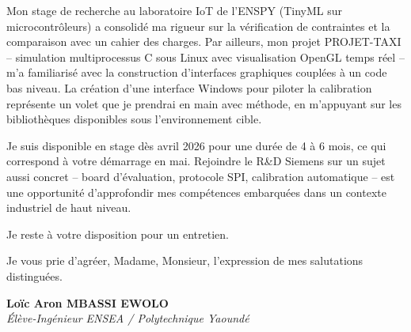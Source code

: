\documentclass[a4paper,11pt]{article}
\begin{document}
Mon stage de recherche au laboratoire IoT de l'ENSPY (TinyML sur microcontrôleurs) a consolidé ma rigueur sur la vérification de contraintes et la comparaison avec un cahier des charges. Par ailleurs, mon projet PROJET-TAXI -- simulation multiprocessus C sous Linux avec visualisation OpenGL temps réel -- m'a familiarisé avec la construction d'interfaces graphiques couplées à un code bas niveau. La création d'une interface Windows pour piloter la calibration représente un volet que je prendrai en main avec méthode, en m'appuyant sur les bibliothèques disponibles sous l'environnement cible.

Je suis disponible en stage dès avril 2026 pour une durée de 4 à 6 mois, ce qui correspond à votre démarrage en mai. Rejoindre le R\&D Siemens sur un sujet aussi concret -- board d'évaluation, protocole SPI, calibration automatique -- est une opportunité d'approfondir mes compétences embarquées dans un contexte industriel de haut niveau.

Je reste à votre disposition pour un entretien.

Je vous prie d'agréer, Madame, Monsieur, l'expression de mes salutations distinguées.

\vspace{0.8cm}

\textbf{Loïc Aron MBASSI EWOLO}\\
\textit{Élève-Ingénieur ENSEA / Polytechnique Yaoundé}
\end{document}
